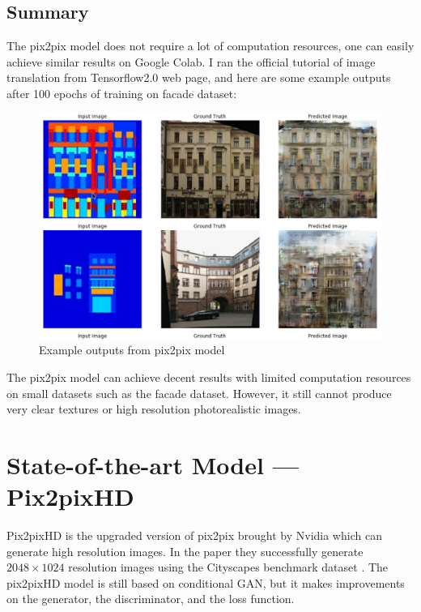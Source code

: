 \subsection{Summary}
The pix2pix model does not require a lot of computation resources, one can easily 
achieve similar results on Google Colab. I ran the official tutorial of image 
translation from Tensorflow2.0 web page, and here are some example outputs after 100
epochs of training on facade dataset\cite{Tylecek13}:
\begin{figure}[H]
    \begin{center}
    \includegraphics[width=12cm]{figures/pix2pix-output}
    \end{center}
    \caption{Example outputs from pix2pix model}
    \label{fig:pix2pix-output}
\end{figure}

The pix2pix model can achieve decent results with limited computation resources on 
small datasets such as the facade dataset. However, it still cannot produce very
clear textures or high resolution photorealistic images.

\section{State-of-the-art Model — Pix2pixHD}
Pix2pixHD\cite{wang2018pix2pixHD} is the upgraded version of pix2pix brought by 
Nvidia which can generate high resolution images. In the paper they successfully 
generate $2048 \times 1024$ resolution images using the Cityscapes benchmark dataset
\cite{Cordts2016Cityscapes}. The pix2pixHD model is still based on conditional GAN, but
it makes improvements on the generator, the discriminator, and the loss function.


